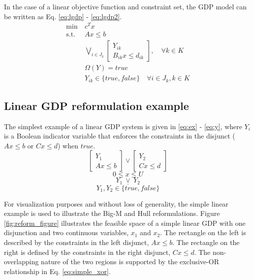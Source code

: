 \documentclass{juliacon}
\begin{document}
In the case of a linear objective function and constraint set, the GDP model can be written as Eq. \eqref{eq:lgdp} - \eqref{eq:lgdp2}.
\begin{align}
    \label{eq:lgdp}
    \min \ & c^Tx \\
    \text{s.t.} \ &Ax \leq b \\
    &\bigvee_{i \in J_k}
    \begin{bmatrix}
        Y_{ik} \\
       B_{ik}x \leq d_{ik}
    \end{bmatrix}, \quad \forall k \in K \\
    & \Omega(Y) = true \\
    \label{eq:lgdp2}
    & Y_{ik} \in \{true, false\} \quad \forall i \in J_k, k \in K
\end{align}
\vskip 6pt

\subsection{Linear GDP reformulation example}
The simplest example of a linear GDP system is given in \eqref{eq:ex} - \eqref{eq:y}, where $Y_i$ is a Boolean indicator variable that enforces the constraints in the disjunct ($Ax \le b$ or $Cx \le d$) when $true$.
\vskip 6pt
\begin{equation}
    \label{eq:ex}
    \begin{bmatrix}
    Y_1 \\ Ax \leq b
    \end{bmatrix}
    \lor
    \begin{bmatrix}
        Y_2 \\ Cx \leq d
    \end{bmatrix}
\end{equation}
\begin{equation}
    \label{eq:x}
    0 \leq x \leq U
\end{equation}
\begin{equation}
    \label{eq:simple_xor}
    Y_1 \ \underline{\vee} \ Y_2
\end{equation}
\begin{equation}
    \label{eq:y}
    Y_1, Y_2 \in \{true, false\}
\end{equation}
\vskip 6pt

For visualization purposes and without loss of generality, the simple linear example is used to illustrate the Big-M and Hull reformulations. Figure \ref{fig:reform_figure} illustrates the feasible space of a simple linear GDP with one disjunction and two continuous variables, $x_1$ and $x_2$. The rectangle on the left is described by the constraints in the left disjunct, $Ax \leq b$. The rectangle on the right is defined by the constraints in the right disjunct, $Cx \le d$. The non-overlapping nature of the two regions is supported by the exclusive-OR relationship in Eq. \eqref{eq:simple_xor}.
\end{document}
